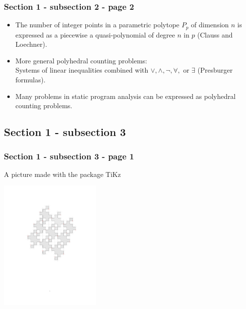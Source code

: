 \documentclass{beamer}
\begin{document}


\begin{frame}\frametitle{\textbf{\LARGE{\textrm{Section 1 - subsection 2 - page 2}}}}
    \begin{itemize}
        \item <1-> The number of integer points in a \alert{parametric polytope} $P_{{p}}$ of dimension $n$
        is expressed as a piecewise a quasi-polynomial of degree $n$ in ${p}$ (Clauss and Loechner).

        \item <2->
        More general \alert{polyhedral counting problems}:\\
        Systems of linear inequalities combined with $\lor, \land, \neg, \forall,$ or $\exists$ (Presburger formulas).
        \item <3->
        Many problems in \alert{static program analysis} can be expressed as polyhedral counting problems.
    \end{itemize}
\end{frame}


\subsection{Section 1 - subsection 3}

\begin{frame}\frametitle{\textbf{\LARGE{\textrm{Section 1 - subsection 3 - page 1}}}}
    A picture made with the package TiKz \\
    \begin{example}
        \centering
        \includegraphics[width=5cm]{images/abadab-anti-theta-01.pdf}
    \end{example}
\end{frame}
\end{document}

